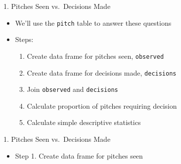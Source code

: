 \begin{frame}[fragile]{1. Pitches Seen vs.~Decisions Made}

\begin{itemize}

\item
  We'll use the \texttt{pitch} table to answer these questions
\item
  Steps:

  \begin{enumerate}
  \def\labelenumi{\arabic{enumi}.}
  
  \item
    Create data frame for pitches seen, \texttt{observed}
  \item
    Create data frame for decisions made, \texttt{decisions}
  \item
    Join \texttt{observed} and \texttt{decisions}
  \item
    Calculate proportion of pitches requiring decision
  \item
    Calculate simple descriptive statistics
  \end{enumerate}
\end{itemize}

\end{frame}

\begin{frame}[fragile]{1. Pitches Seen vs.~Decisions Made}

\begin{itemize}

\item
  Step 1. Create data frame for pitches seen
\end{itemize}

\footnotesize

\begin{Shaded}
\end{Shaded}

\end{frame}

